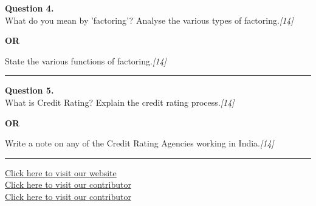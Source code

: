 \documentclass[11pt,a4paper]{article}
\newcommand{\pts}[1]{\hfill   \textit{[#1]}}
\begin{document}
\noindent   \textbf{Question 4.} \\
What do you mean by 'factoring'? Analyse the various types of factoring.\pts{14}

\centerline{   \textbf{OR}}

State the various functions of factoring.\pts{14}

\medskip\rule{\linewidth}{0.2pt}




\noindent   \textbf{Question 5.} \\
What is Credit Rating? Explain the credit rating process.\pts{14}

\centerline{   \textbf{OR}}

Write a note on any of the Credit Rating Agencies working in India.\pts{14}

\vfill
\rule{\linewidth}{0.4pt}

\begin{center}\small
\href{https://bhu-exam.vercel.app/}{Click here to visit our website}\\[4pt]
\href{https://me-aryan.vercel.app/}{Click here to visit our contributor}\\[4pt]
\href{https://quashan-me.vercel.app/}{Click here to visit our contributor}
\end{center}
\end{document}
